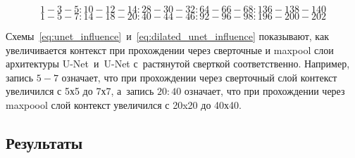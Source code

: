\begin{equation} 
\label{eq:unet_influence}
1-3-5:10-12-14:28-30-32:64-66-68:136-138-140
\end{equation}
\begin{equation} 
\label{eq:dilated_unet_influence}
1-5-7:14-18-20:40-44-46:92-96-98:196-200-202
\end{equation}

Схемы~\eqref{eq:unet_influence}~и~\eqref{eq:dilated_unet_influence} показывают, как увеличивается контекст при прохождении через сверточные и maxpool слои архитектуры U-Net~и~U-Net с~растянутой сверткой соответственно. Например, запись $5-7$ означает, что при прохождении через сверточный слой контекст увеличился с 5х5 до 7х7, а~запись $20:40$ означает, что при прохождении через maxpoool слой контекст увеличился с 20x20 до 40х40.

\newpage
\subsection{Результаты} 

